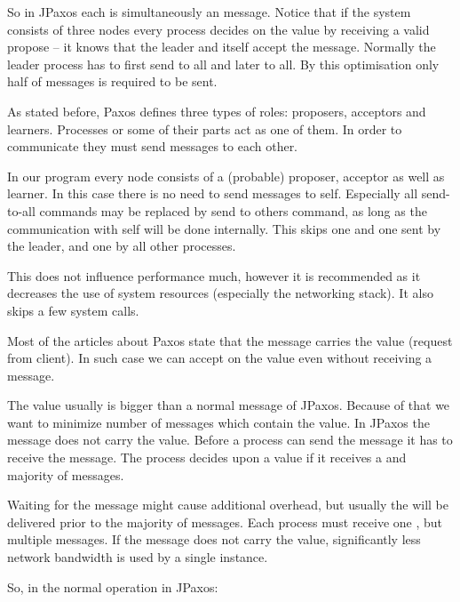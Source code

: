 So in JPaxos each \propose is simultaneously an \accept message. Notice that if the system consists of three nodes every process decides on the value by receiving a valid propose -- it knows that the leader and itself
accept the message. Normally the leader process has to first send \propose to all and later \accept to all. By this optimisation only half of messages is required to be sent.


As stated before, Paxos defines three types of roles: proposers, acceptors and learners. Processes or some of their parts act as one of them. In order to communicate they must send messages to each other.

In our program every node consists of a (probable) proposer, acceptor as well as learner. In this case there is no need to send messages to self. Especially all send-to-all commands may be replaced by send to others command, as long as the communication with self will be done internally. This skips one \accept and one \propose sent by the leader, and one \accept by all other processes.

This does not influence performance much, however it is recommended as it decreases the use of system resources (especially the networking stack). It also skips a few system calls.


Most of the articles about Paxos state that the \accept message carries the value (request from client).
In such case we can accept on the value even without receiving a \propose message.

The value usually is bigger than a normal message of JPaxos. Because of that we want to minimize number of messages which contain the value.
In JPaxos the \accept message does not carry the value. Before a process can send the \accept message it has to receive the \propose message. The process decides upon a value if it receives a \propose and majority of \accept messages.

Waiting for the \propose message might cause additional overhead, but usually the \propose will be delivered prior to the majority of \accept messages.
Each process must receive one \propose[], but multiple \accept messages. If the \accept message does not carry the value, significantly less network bandwidth is used by a single instance.


\label{par:bestCaseMessages}
So, in the normal operation in JPaxos:

